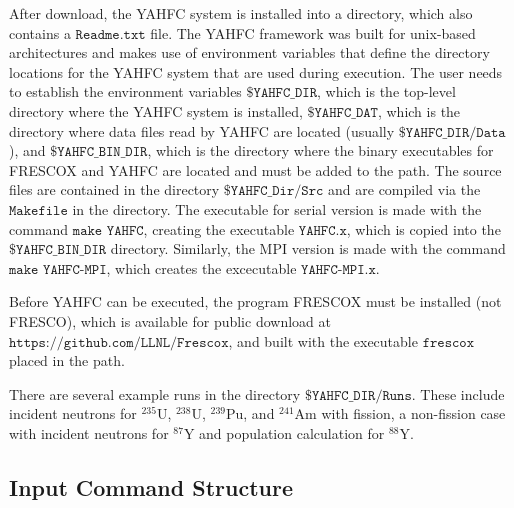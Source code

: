 \documentclass[
10pt,
showpacs,preprintnumbers,footinbib,
amsfonts,amsmath,amssymb,
aps,
prc,twocolumn,groupedaddress,superscriptaddress,
showkeys,
nofootinbib
]{revtex4-1}
\begin{document}
After download, the YAHFC system is installed into a directory, which also contains a ${\texttt{Readme.txt}}$ file.
The YAHFC framework was built for unix-based architectures and makes use of environment variables that define the directory locations for the YAHFC system that are used during execution. The user needs to establish the environment variables ${\texttt{\$YAHFC\_DIR}}$, which is the top-level directory where the YAHFC system is installed, ${\texttt{\$YAHFC\_DAT}}$, which is the directory where data files read by YAHFC are located (usually ${\texttt{\$YAHFC\_DIR/Data}}$), and ${\texttt{\$YAHFC\_BIN\_DIR}}$, which is the directory where the binary executables for FRESCOX and YAHFC are located and must be added to the path. The source files are contained in the directory ${\texttt{\$YAHFC\_Dir/Src}}$ and are compiled via the ${\texttt{Makefile}}$ in the directory. The executable for serial version is made with the command ${\texttt{make YAHFC}}$, creating the executable ${\texttt{YAHFC.x}}$, which is copied into the ${\texttt{\$YAHFC\_BIN\_DIR}}$ directory. Similarly, the MPI version is made with the command ${\texttt{make YAHFC-MPI}}$, which creates the excecutable ${\texttt{YAHFC-MPI.x}}$.

Before YAHFC can be executed, the program FRESCOX must be installed (not FRESCO), which is available for public download at ${\texttt{https://github.com/LLNL/Frescox}}$, and built with the executable ${\texttt{frescox}}$ placed in the path.

There are several example runs in the directory ${\texttt{\$YAHFC\_DIR/Runs}}$. These include incident neutrons for $^{235}$U, $^{238}$U, $^{239}$Pu, and $^{241}$Am with fission, a non-fission case with incident neutrons for $^{87}$Y and population calculation for $^{88}$Y. 

\subsection{Input Command Structure}
\end{document}
